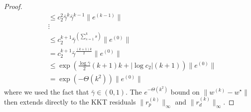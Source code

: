 \documentclass[10pt,a4paper]{amsart}
\begin{document}
\begin{proof}
\begin{equation}
\begin{aligned}
        &\leq c_2^2 \bar{\gamma}^{k} \bar{\gamma}^{k-1} \|e^{(k-1)}\| \\
        &\vdots \\
        &\leq c_2^{k+1} \bar{\gamma}^{\left(\sum_{s=1}^k s\right)} \|e^{(0)}\| \\
        &= c_2^{k+1} \bar{\gamma}^{\frac{(k+1)k}{2}} \|e^{(0)}\| \\
        &\leq\exp \left(\frac{\log \bar{\gamma}}{2}(k+1) k + |\log c_2|(k+1)\right) \|e^{(0)}\| \\
        &= \exp \left( -\Theta\left(k^2\right)\right) \|e^{(0)}\|
    \end{aligned}
\end{equation}
where we used the fact that $\bar{\gamma} \in (0, 1)$. 
The $e^{-\Theta(k^2)}$ bound on $\|w^{(k)} - w^\star\|$ then extends directly to the KKT residuals $\|r_p^{(k)}\|_{\infty}$ and $\|r_d^{(k)}\|_{\infty}$.
\end{proof}
\end{document}
